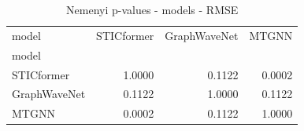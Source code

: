 \begin{table}
\caption{Nemenyi p-values - models - RMSE}
\label{tab:nemenyi_models_rmse}
\begin{tabular}{lrrr}
\toprule
model & STICformer & GraphWaveNet & MTGNN \\
model &  &  &  \\
\midrule
STICformer & 1.0000 & 0.1122 & 0.0002 \\
GraphWaveNet & 0.1122 & 1.0000 & 0.1122 \\
MTGNN & 0.0002 & 0.1122 & 1.0000 \\
\bottomrule
\end{tabular}
\end{table}
